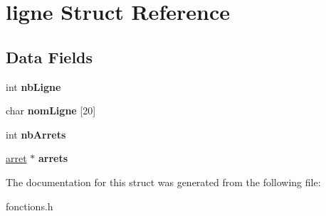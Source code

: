 \hypertarget{structligne}{}\section{ligne Struct Reference}
\label{structligne}
\subsection*{Data Fields}
\begin{DoxyCompactItemize}
\item 
\mbox{\label{structligne_a8192a702a6a4af3dd9d5941d3975b974}} 
int {\bfseries nb\+Ligne}
\item 
\mbox{\label{structligne_ab2a5bc16cbee72be9ee5007e444e9941}} 
char {\bfseries nom\+Ligne} \mbox{[}20\mbox{]}
\item 
\mbox{\label{structligne_ae20961cfb632042b1a67c14c73ff548b}} 
int {\bfseries nb\+Arrets}
\item 
\mbox{\label{structligne_a461e985d0ebbfa39dd830d707a1ec142}} 
\hyperlink{structarret}{arret} $\ast$ {\bfseries arrets}
\end{DoxyCompactItemize}


The documentation for this struct was generated from the following file\+:\begin{DoxyCompactItemize}
\item 
fonctions.\+h\end{DoxyCompactItemize}
